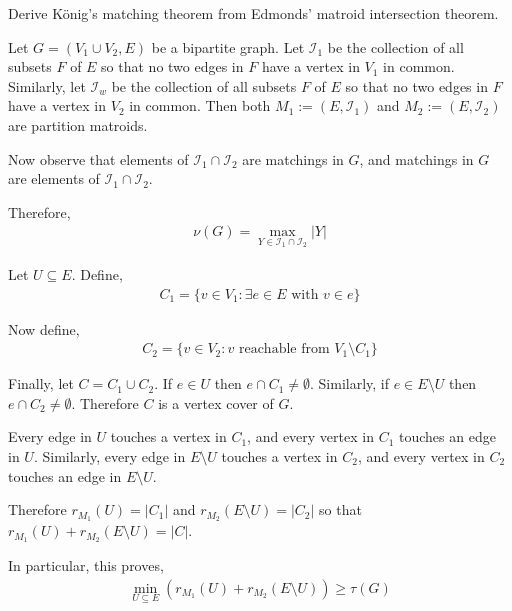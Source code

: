 \documentclass[10pt]{article}
\begin{document}
\begin{problem}[Problem 10.22]
Derive K\"onig's matching theorem from Edmonds' matroid intersection theorem. 
\end{problem}

\begin{solution}

Let \( G = (V_1\cup V_2, E) \) be a bipartite graph.
Let \( \mathcal{I}_1 \) be the collection of all subsets \( F \) of \( E \) so that no two edges in \( F \) have a vertex in \( V_1 \) in common.
Similarly, let \( \mathcal{I}_w \) be the collection of all subsets \( F \) of \( E \) so that no two edges in \( F \) have a vertex in \( V_2 \) in common.
Then both \( M_1:=(E, \mathcal{I}_1)  \) and \( M_2:=(E, \mathcal{I}_2)  \) are partition matroids.

Now observe that elements of \( \mathcal{I}_1\cap \mathcal{I}_2 \) are matchings in \( G \), and matchings in \( G \) are elements of \( \mathcal{I}_1\cap \mathcal{I}_2 \).

Therefore,
\begin{align*}
    \nu(G) = \max_{Y\in \mathcal{I}_1\cap \mathcal{I}_2} |Y| 
\end{align*}


Let \( U\subseteq E \). Define,
\begin{align*}
    C_1 = \{ v\in V_1 : \exists e\in E \text{ with } v\in e \}
\end{align*}

Now define,
\begin{align*}
    C_2 = \{ v\in V_2 : v \text{ reachable from } V_1\setminus C_1 \}
\end{align*}

Finally, let \( C = C_1 \cup C_2 \). If \( e\in U \) then \( e\cap C_1 \neq \emptyset \). Similarly, if \( e\in E\setminus U \) then \( e\cap C_2 \neq \emptyset \). Therefore \( C \) is a vertex cover of \( G \).

Every edge in \( U \) touches a vertex in \( C_1 \), and every vertex in \( C_1 \) touches an edge in \( U \). 
Similarly, every edge in \( E\setminus U \) touches a vertex in \( C_2 \), and every vertex in \( C_2 \) touches an edge in \( E\setminus U \). 

Therefore \( r_{M_1}(U) = |C_1| \) and \( r_{M_2}(E\setminus U) = |C_2| \) so that \( r_{M_1}(U) + r_{M_2}(E\setminus U) = |C| \).

In particular, this proves,
\begin{align*}
    \min_{U\subseteq E} (r_{M_1}(U) + r_{M_2}(E\setminus U)) \geq  \tau(G)
\end{align*}





\end{solution}
\end{document}
